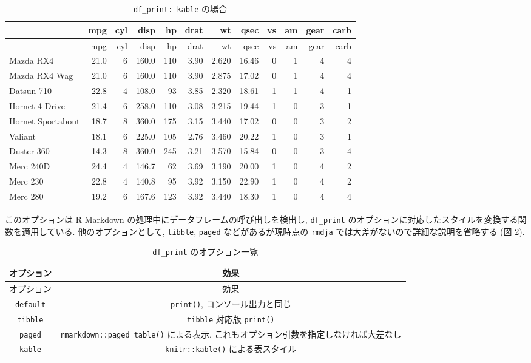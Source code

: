 \documentclass[
  xelatex,ja=standard,jafont=noto]{bxjsbook}
\theoremstyle{definition}
\theoremstyle{definition}
\theoremstyle{definition}
\theoremstyle{definition}
\theoremstyle{remark}
\begin{document}
\begin{longtable}[]{@{}lrrrrrrrrrrr@{}}
\caption{\label{tab:df-print-kable}\texttt{df\_print:\ kable}
の場合}\tabularnewline
\toprule
& mpg & cyl & disp & hp & drat & wt & qsec & vs & am & gear & carb \\
\midrule
\endfirsthead
\toprule
& mpg & cyl & disp & hp & drat & wt & qsec & vs & am & gear & carb \\
\midrule
\endhead
Mazda RX4 & 21.0 & 6 & 160.0 & 110 & 3.90 & 2.620 & 16.46 & 0 & 1 & 4 &
4 \\
Mazda RX4 Wag & 21.0 & 6 & 160.0 & 110 & 3.90 & 2.875 & 17.02 & 0 & 1 &
4 & 4 \\
Datsun 710 & 22.8 & 4 & 108.0 & 93 & 3.85 & 2.320 & 18.61 & 1 & 1 & 4 &
1 \\
Hornet 4 Drive & 21.4 & 6 & 258.0 & 110 & 3.08 & 3.215 & 19.44 & 1 & 0 &
3 & 1 \\
Hornet Sportabout & 18.7 & 8 & 360.0 & 175 & 3.15 & 3.440 & 17.02 & 0 &
0 & 3 & 2 \\
Valiant & 18.1 & 6 & 225.0 & 105 & 2.76 & 3.460 & 20.22 & 1 & 0 & 3 &
1 \\
Duster 360 & 14.3 & 8 & 360.0 & 245 & 3.21 & 3.570 & 15.84 & 0 & 0 & 3 &
4 \\
Merc 240D & 24.4 & 4 & 146.7 & 62 & 3.69 & 3.190 & 20.00 & 1 & 0 & 4 &
2 \\
Merc 230 & 22.8 & 4 & 140.8 & 95 & 3.92 & 3.150 & 22.90 & 1 & 0 & 4 &
2 \\
Merc 280 & 19.2 & 6 & 167.6 & 123 & 3.92 & 3.440 & 18.30 & 1 & 0 & 4 &
4 \\
\bottomrule
\end{longtable}

このオプションは R Markdown の処理中にデータフレームの呼び出しを検出し,
\texttt{df\_print}
のオプションに対応したスタイルを変換する関数を適用している.
他のオプションとして, \texttt{tibble}, \texttt{paged}
などがあるが現時点の \texttt{rmdja}
では大差がないので詳細な説明を省略する (図 \ref{tab:df-print-ops}).

\begin{longtable}[]{@{}cc@{}}
\caption{\label{tab:df-print-ops} \texttt{df\_print}
のオプション一覧}\tabularnewline
\toprule
オプション & 効果 \\
\midrule
\endfirsthead
\toprule
オプション & 効果 \\
\midrule
\endhead
\texttt{default} & \texttt{print()}, コンソール出力と同じ \\
\texttt{tibble} & \texttt{tibble} 対応版 \texttt{print()} \\
\texttt{paged} & \texttt{rmarkdown::paged\_table()} による表示,
これもオプション引数を指定しなければ大差なし \\
\texttt{kable} & \texttt{knitr::kable()} による表スタイル \\
\bottomrule
\end{longtable}
\end{document}

